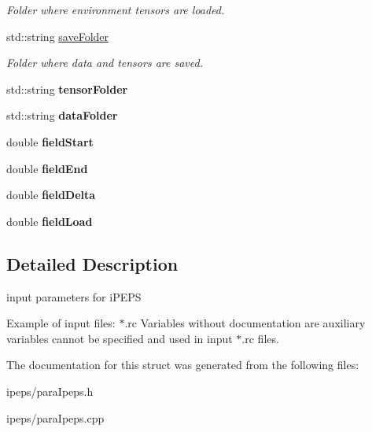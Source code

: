 \begin{DoxyCompactItemize}
\begin{DoxyCompactList}\small\item\em Folder where environment tensors are loaded. \end{DoxyCompactList}\item 
std\+::string \hyperlink{structparaIpeps_ad0e0d70b8aa96bc7c884dfc3b9375651}{save\+Folder}\hypertarget{structparaIpeps_ad0e0d70b8aa96bc7c884dfc3b9375651}{}\label{structparaIpeps_ad0e0d70b8aa96bc7c884dfc3b9375651}

\begin{DoxyCompactList}\small\item\em Folder where data and tensors are saved. \end{DoxyCompactList}\item 
std\+::string {\bfseries tensor\+Folder}\hypertarget{structparaIpeps_a5bc3b79e15db4ef970d262bf95c4acf6}{}\label{structparaIpeps_a5bc3b79e15db4ef970d262bf95c4acf6}

\item 
std\+::string {\bfseries data\+Folder}\hypertarget{structparaIpeps_af0e8a08151138476d93ea27c72af8bc9}{}\label{structparaIpeps_af0e8a08151138476d93ea27c72af8bc9}

\item 
double {\bfseries field\+Start}\hypertarget{structparaIpeps_ab3ae52dd2cd4b9ee83416ac97b03f019}{}\label{structparaIpeps_ab3ae52dd2cd4b9ee83416ac97b03f019}

\item 
double {\bfseries field\+End}\hypertarget{structparaIpeps_a930a1696effd5e8e37571ede336b3d6d}{}\label{structparaIpeps_a930a1696effd5e8e37571ede336b3d6d}

\item 
double {\bfseries field\+Delta}\hypertarget{structparaIpeps_a6398a53cd3eb7a418cc46a2ee5c64a6e}{}\label{structparaIpeps_a6398a53cd3eb7a418cc46a2ee5c64a6e}

\item 
double {\bfseries field\+Load}\hypertarget{structparaIpeps_a4d2d2848b1bd973c001a6c99bb36aa85}{}\label{structparaIpeps_a4d2d2848b1bd973c001a6c99bb36aa85}

\end{DoxyCompactItemize}


\subsection{Detailed Description}
input parameters for i\+P\+E\+PS 

Example of input files\+: $\ast$.rc Variables without documentation are auxiliary variables cannot be specified and used in input $\ast$.rc files. 

The documentation for this struct was generated from the following files\+:\begin{DoxyCompactItemize}
\item 
ipeps/para\+Ipeps.\+h\item 
ipeps/para\+Ipeps.\+cpp\end{DoxyCompactItemize}
